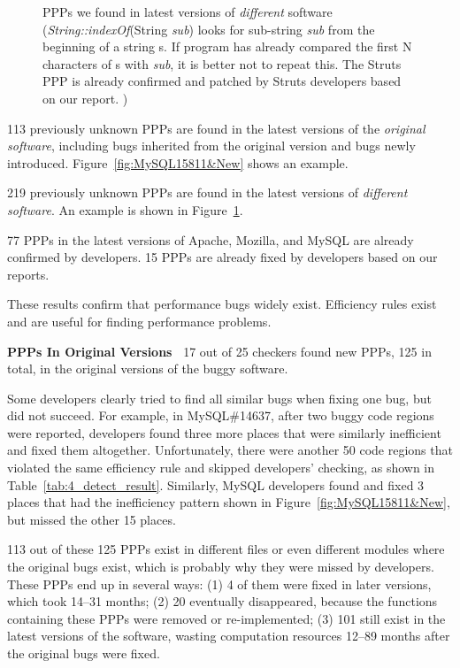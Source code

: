 \begin{figure}
  \centering
  \hfill
  \framebox{}
  \hfill
  \framebox{}
  \hspace*{\fill}
  \caption{PPPs we found in latest versions of {\it different} software (\textit{String::indexOf}(String \textit{sub}) 
  looks for sub-string \textit{sub} from the beginning of a string s. 
  If program has already compared the first N characters of s with \textit{sub}, 
  it is better not to repeat this. 
  The Struts PPP is already confirmed and patched by Struts developers based on our report.  )}
  \label{fig:Apache34464&New}
\end{figure}

113 previously unknown PPPs are found in the latest versions of the 
{\it original software}, including bugs inherited from the original version
and bugs newly introduced. Figure~\ref{fig:MySQL15811&New} shows an example. 

219 previously unknown PPPs are found in the latest versions of
{\it different software}. An example is shown in Figure~\ref{fig:Apache34464&New}. 

77 PPPs in the latest versions of Apache, Mozilla, and MySQL
are already confirmed by developers. 
15 PPPs are already fixed by developers based on our reports.

These results confirm that performance bugs widely 
exist. Efficiency rules exist and are useful for finding
performance problems.


{\bf PPPs In Original Versions\ }
17 out of 25 checkers found new PPPs, 125 in total, in the original versions
of the buggy software.

Some developers clearly tried to find all similar bugs when
fixing one bug, but did not succeed.
For example, in MySQL\#14637, after two buggy code regions were 
reported, developers found three more places that were similarly
inefficient and fixed them altogether. Unfortunately,
there were another 50 code regions that violated the same efficiency
rule and skipped developers' checking, as shown in 
Table~\ref{tab:4_detect_result}. Similarly, MySQL developers found and fixed 3 places
that had the inefficiency pattern shown in Figure~\ref{fig:MySQL15811&New},
but missed the other 15 places.

113 out of these 125 PPPs exist in different files or even different 
modules where the original bugs exist, which is probably why they were missed by
developers. These PPPs end up in several ways:
(1) 4 of them were fixed in later versions, which took 14--31 months;
(2) 20 eventually disappeared, because the
functions containing these PPPs were removed or re-implemented;
(3) 101 still exist in the latest versions of the software, wasting
computation resources 12--89 months after the original bugs were fixed.

